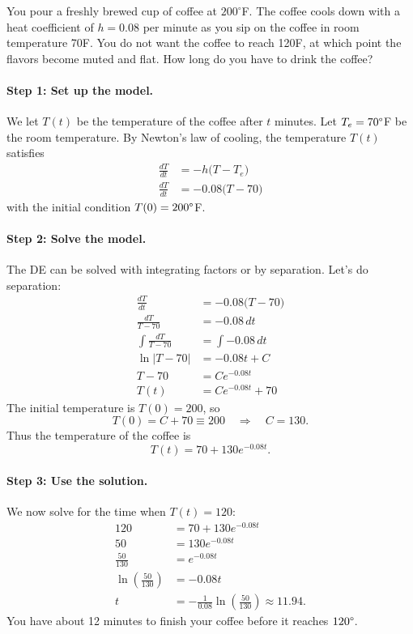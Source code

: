 \documentclass[10pt,letterpaper]{article}
\begin{document}
\begin{example}[1]{    
You pour a freshly brewed cup of coffee at $200^\circ$F.
The coffee cools down with a heat coefficient of $h=0.08$ per minute as you sip on the coffee in room temperature  70\degree F. You do not want the coffee to reach 120\degree F, at which point the flavors become muted and flat. How long do you have to drink the coffee? 
}

\paragraph{Step 1: Set up the model.} We let $T(t)$ be the temperature of the coffee after $t$ minutes. Let $T_e=70\degree$F be the room temperature. By Newton’s law of cooling, the temperature $T(t)$ satisfies
\[
\begin{aligned}
\frac{dT}{dt} &= -h\bigl(T - T_e\bigr)\\
\frac{dT}{dt} &= -0.08\bigl(T - 70\bigr)
\end{aligned}
\]
with the initial condition $T(0)=200\degree$F. 
\paragraph{Step 2: Solve the model.} The DE can be solved with integrating factors or by separation. Let's do separation:
\begin{align*}
\frac{dT}{dt} &= -0.08\bigl(T - 70\bigr)\\
\frac{dT}{T - 70} &= -0.08\,dt\\    
\int \frac{dT}{T - 70} &= \int -0.08\,dt\\
\ln|T - 70| &= -0.08t + C\\
T-70 &= Ce^{-0.08t}\\
T(t)&= Ce^{-0.08t}+70
\end{align*}
The initial temperature is $T(0)=200$, so
\[
T(0) =  C +70 \equiv 200\quad \Rightarrow \quad C = 130.
\]
Thus the temperature of the coffee is 
\[
\boxed{
T(t) = 70 + 130e^{-0.08t}.
}
\]
\paragraph{Step 3: Use the solution.}
We now solve for the time when $T(t)=120$:
\begin{align*}
120 &= 70 + 130e^{-0.08t} \\
50 &= 130e^{-0.08t} \\
\frac{50}{130} &= e^{-0.08t} \\
\ln\!\left(\frac{50}{130}\right) &= -0.08t \\
t &= -\frac{1}{0.08}\ln\!\left(\frac{50}{130}\right) \approx 11.94.
\end{align*}
You have about 12 minutes to finish your coffee before it reaches $120\degree$.
\end{example}
\end{document}
